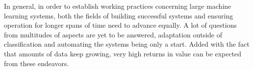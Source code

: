  
 In general, in order to establish working practices concerning large machine learning systems, both the fields of building successful systems and ensuring operation for longer spans of time need to advance equally. A lot of questions from multitudes of aspects are yet to be answered, adaptation outside of classification and automating the systems being only a start. Added with the fact that amounts of data keep growing, very high returns in value can be expected from these endeavors.
